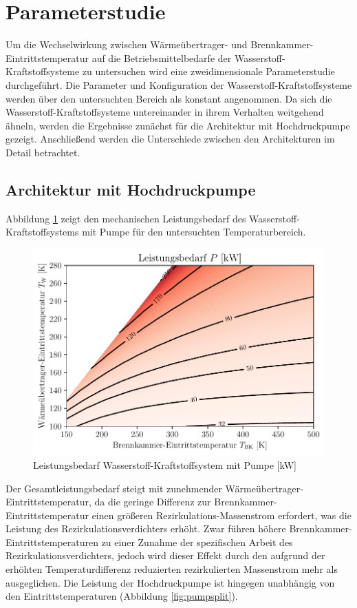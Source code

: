 \section{Parameterstudie}

Um die Wechselwirkung zwischen Wärmeübertrager- und Brennkammer-Eintrittstemperatur auf die Betriebsmittelbedarfe der Wasserstoff-Kraftstoffsysteme zu untersuchen wird eine zweidimensionale Parameterstudie durchgeführt. Die Parameter und Konfiguration der Wasserstoff-Kraftstoffsysteme werden über den untersuchten Bereich als konstant angenommen. Da sich die Wasserstoff-Kraftstoffsysteme untereinander in ihrem Verhalten weitgehend ähneln, werden die Ergebnisse zunächst für die Architektur mit Hochdruckpumpe gezeigt. Anschließend werden die Unterschiede zwischen den Architekturen im Detail betrachtet.

\subsection{Architektur mit Hochdruckpumpe}

Abbildung \ref{fig:pumppower} zeigt den mechanischen Leistungsbedarf des Wasserstoff-Kraftstoffsystems mit Pumpe für den untersuchten Temperaturbereich. 

\begin{figure}[ht]
\centering
\includegraphics[width=0.9\linewidth]{4_Abbildungen/2_Hauptteil/Ergebnisse/Pumpepowercontour.pdf}
  \caption{Leistungsbedarf Wasserstoff-Kraftstoffsystem mit Pumpe [kW]}
  \label{fig:pumppower}
\end{figure}
\FloatBarrier

Der Gesamtleistungsbedarf steigt mit zunehmender Wärmeübertrager-Eintrittstemperatur, da die geringe Differenz zur Brennkammer-Eintrittstemperatur einen größeren Rezirkulations-Massenstrom erfordert, was die Leistung des Rezirkulationsverdichters erhöht. Zwar führen höhere Brennkammer-Eintrittstemperaturen zu einer Zunahme der spezifischen Arbeit des Rezirkulationsverdichters, jedoch wird dieser Effekt durch den aufgrund der erhöhten Temperaturdifferenz reduzierten rezirkulierten Massenstrom mehr als ausgeglichen. Die Leistung der Hochdruckpumpe ist hingegen unabhängig von den Eintrittstemperaturen (Abbildung \ref{fig:pumpsplit}). 

